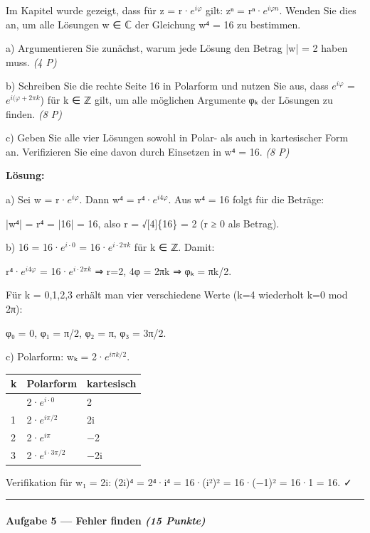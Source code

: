 \documentclass[11pt, a4paper]{article}
\begin{document}
Im Kapitel wurde gezeigt, dass für z = r·$e^{iφ}$ gilt: zⁿ = rⁿ·$e^{iφn}$. Wenden Sie dies an, um alle Lösungen w ∈ ℂ der Gleichung w⁴ = 16 zu bestimmen.


a) Argumentieren Sie zunächst, warum jede Lösung den Betrag |w| = 2 haben muss. \textit{(4 P)}


b) Schreiben Sie die rechte Seite 16 in Polarform und nutzen Sie aus, dass $e^{iφ}$ = $e^{i(φ+2πk}$) für k ∈ ℤ gilt, um alle möglichen Argumente φₖ der Lösungen zu finden. \textit{(8 P)}


c) Geben Sie alle vier Lösungen sowohl in Polar- als auch in kartesischer Form an. Verifizieren Sie eine davon durch Einsetzen in w⁴ = 16. \textit{(8 P)}


\textbf{Lösung:}


a) Sei w = r·$e^{iφ}$. Dann w⁴ = r⁴·$e^{i4φ}$. Aus w⁴ = 16 folgt für die Beträge:

|w⁴| = r⁴ = |16| = 16, also r = √[4]\{16\} = 2 (r ≥ 0 als Betrag).


b) 16 = 16·$e^{i·0}$ = 16·$e^{i·2πk}$ für k ∈ ℤ. Damit:

r⁴·$e^{i4φ}$ = 16·$e^{i·2πk}$ ⇒ r=2, 4φ = 2πk ⇒ φₖ = πk/2.


Für k = 0,1,2,3 erhält man vier verschiedene Werte (k=4 wiederholt k=0 mod 2π):

φ₀ = 0, φ₁ = π/2, φ₂ = π, φ₃ = 3π/2.


c) Polarform: wₖ = 2·$e^{iπk/2}$.



{\small
\begin{tabularx}{\linewidth}{XXX}
\hline
\rowcolor{tableheadbg}
{\color{white}\textbf{k}} & {\color{white}\textbf{Polarform}} & {\color{white}\textbf{kartesisch}} \\[2pt]
\hline
\endhead
\hline
\endfoot
0 & 2·$e^{i·0}$ & 2 \\
1 & 2·$e^{iπ/2}$ & 2i \\
2 & 2·$e^{iπ}$ & −2 \\
3 & 2·$e^{i·3π/2}$ & −2i \\
\end{tabularx}
}


Verifikation für w₁ = 2i: (2i)⁴ = 2⁴·i⁴ = 16·(i²)² = 16·(−1)² = 16·1 = 16. ✓



\noindent\textcolor{rulegray}{\rule{\linewidth}{0.4pt}}


\paragraph{Aufgabe 5 — Fehler finden \textit{(15 Punkte)}}\mbox{}\\[2pt]
\end{document}
